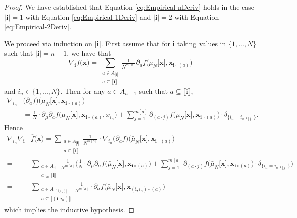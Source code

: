 \documentclass[a4paper,11pt,twoside]{article}
\numberwithin{equation}{section}
\theoremstyle{plain}
\newcommand{\1}{\mathbbm{1}}
\begin{document}
	\begin{proof}
		We have established that Equation \eqref{eq:Empirical-nDeriv} holds in the case $|\boldsymbol{i}| = 1$ with Equation \eqref{eq:Empirical-1Deriv} and $|\boldsymbol{i}| = 2$ with Equation \eqref{eq:Empirical-2Deriv}. 
		
		We proceed via induction on $|\boldsymbol{i}|$. First assume that for $\boldsymbol{i}$ taking values in $\{1, ..., N\}$ such that $|\boldsymbol{i}| = n-1$, we have that
		\begin{equation*}
			\nabla_{\boldsymbol{i}} \overline{f} \Big( \boldsymbol{x} \Big) = \sum_{\substack{a \in A_{|\boldsymbol{i}|} \\ a\subseteq \llbracket \boldsymbol{i} \rrbracket}} \tfrac{1}{N^{m[a]}} \partial_a f \Big( \bar{\mu}_N\big[ \boldsymbol{x} \big], \boldsymbol{x}_{\boldsymbol{i}\circ (a)} \Big)
		\end{equation*}
		and $i_{n} \in \{1, ..., N\}$. Then for any $a\in A_{n-1}$ such that $a\subseteq \llbracket \boldsymbol{i} \rrbracket$, 
		\begin{align*}
			\nabla_{i_{n}} &\big(\partial_a f\big) \Big( \bar{\mu}_{N}\big[ \boldsymbol{x} \big], \boldsymbol{x}_{\boldsymbol{i}\circ (a)} \Big)
			\\
			&=
			\tfrac{1}{N} \cdot \partial_\mu \partial_a f\Big( \bar{\mu}_{N}\big[ \boldsymbol{x} \big], \boldsymbol{x}_{\boldsymbol{i}\circ (a)}, x_{i_{n}} \Big)  
			+ 
			\sum_{j=1}^{m[a]} \partial_{(a\cdot j)} f\Big( \bar{\mu}_{N}\big[ \boldsymbol{x} \big], \boldsymbol{x}_{\boldsymbol{i}\circ (a)} \Big) \cdot \delta_{\{ i_n = i_{a^{-1}[j]} \} }.  
		\end{align*}
		Hence
		\begin{align*}
			\nabla_{i_n} \nabla_{\boldsymbol{i}} &\overline{f}\Big( \boldsymbol{x} \Big) 
			= 
			\sum_{\substack{a\in A_{|\boldsymbol{i}|} \\ a \subseteq \llbracket \boldsymbol{i} \rrbracket}} \tfrac{1}{N^{m[a]}} \cdot \nabla_{i_n} \big(\partial_a f\big) \Big( \bar{\mu}_N\big[ \boldsymbol{x} \big], \boldsymbol{x}_{\boldsymbol{i}\circ (a)} \Big) 
			\\
			=& \sum_{\substack{a\in A_{|\boldsymbol{i}|} \\ a \subseteq \llbracket \boldsymbol{i} \rrbracket}} \tfrac{1}{N^{m[a]}} \bigg( \tfrac{1}{N} \cdot \partial_\mu \partial_a f\Big( \bar{\mu}_N\big[ \boldsymbol{x} \big], \boldsymbol{x}_{\boldsymbol{i}\circ (a)} \Big) + \sum_{j=1}^{m[a]} \partial_{(a\cdot j)} f\Big( \bar{\mu}_N\big[ \boldsymbol{x} \big], \boldsymbol{x}_{\boldsymbol{i}\circ (a)} \Big) \cdot \delta_{\{i_n = i_{a^{-1}[j]}\}} \bigg) 
			\\
			=&\sum_{\substack{a\in A_{|(\boldsymbol{i}, i_n)|} \\ a\subseteq \llbracket (\boldsymbol{i}, i_n)\rrbracket}} \tfrac{1}{N^{m[a]}} \cdot \partial_a f\Big( \bar{\mu}_N\big[ \boldsymbol{x} \big], \boldsymbol{x}_{(\boldsymbol{i}, i_n)\circ (a)} \Big) 
		\end{align*}
		which implies the inductive hypothesis. 
	\end{proof}
	
\end{document}
